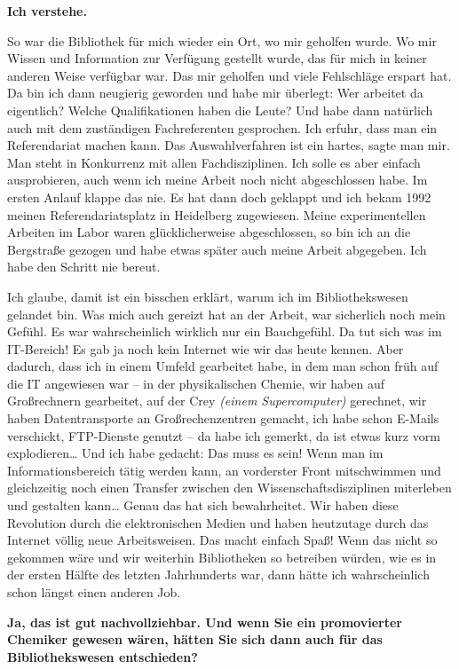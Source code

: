 \documentclass[a4paper,
fontsize=11pt,
oneside,
numbers=noperiodatend,
parskip=half-,
bibliography=totoc,
final
]{scrartcl}
\begin{document}
\textbf{Ich verstehe.}

So war die Bibliothek für mich wieder ein Ort, wo mir geholfen wurde. Wo
mir Wissen und Information zur Verfügung gestellt wurde, das für mich in
keiner anderen Weise verfügbar war. Das mir geholfen und viele
Fehlschläge erspart hat. Da bin ich dann neugierig geworden und habe mir
überlegt: Wer arbeitet da eigentlich? Welche Qualifikationen haben die
Leute? Und habe dann natürlich auch mit dem zuständigen Fachreferenten
gesprochen. Ich erfuhr, dass man ein Referendariat machen kann. Das
Auswahlverfahren ist ein hartes, sagte man mir. Man steht in Konkurrenz
mit allen Fachdisziplinen. Ich solle es aber einfach ausprobieren, auch
wenn ich meine Arbeit noch nicht abgeschlossen habe. Im ersten Anlauf
klappe das nie. Es hat dann doch geklappt und ich bekam 1992 meinen
Referendariatsplatz in Heidelberg zugewiesen. Meine experimentellen
Arbeiten im Labor waren glücklicherweise abgeschlossen, so bin ich an
die Bergstraße gezogen und habe etwas später auch meine Arbeit
abgegeben. Ich habe den Schritt nie bereut.

Ich glaube, damit ist ein bisschen erklärt, warum ich im
Bibliothekswesen gelandet bin. Was mich auch gereizt hat an der Arbeit,
war sicherlich noch mein Gefühl. Es war wahrscheinlich wirklich nur ein
Bauchgefühl. Da tut sich was im IT-Bereich! Es gab ja noch kein Internet
wie wir das heute kennen. Aber dadurch, dass ich in einem Umfeld
gearbeitet habe, in dem man schon früh auf die IT angewiesen war -- in
der physikalischen Chemie, wir haben auf Großrechnern gearbeitet, auf
der Crey \emph{(einem Supercomputer)} gerechnet, wir haben
Datentransporte an Großrechenzentren gemacht, ich habe schon E-Mails
verschickt, FTP-Dienste genutzt -- da habe ich gemerkt, da ist etwas
kurz vorm explodieren\ldots{} Und ich habe gedacht: Das muss es sein!
Wenn man im Informationsbereich tätig werden kann, an vorderster Front
mitschwimmen und gleichzeitig noch einen Transfer zwischen den
Wissenschaftsdisziplinen miterleben und gestalten kann\ldots{} Genau das
hat sich bewahrheitet. Wir haben diese Revolution durch die
elektronischen Medien und haben heutzutage durch das Internet völlig
neue Arbeitsweisen. Das macht einfach Spaß! Wenn das nicht so gekommen
wäre und wir weiterhin Bibliotheken so betreiben würden, wie es in der
ersten Hälfte des letzten Jahrhunderts war, dann hätte ich
wahrscheinlich schon längst einen anderen Job.

\textbf{Ja, das ist gut nachvollziehbar. Und wenn Sie ein promovierter
Chemiker gewesen wären, hätten Sie sich dann auch für das
Bibliothekswesen entschieden?}
\end{document}
